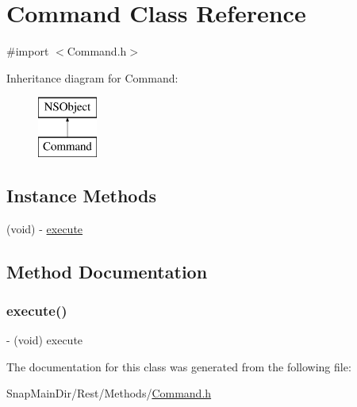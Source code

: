 \hypertarget{interface_command}{}\section{Command Class Reference}
\label{interface_command}


{\ttfamily \#import $<$Command.\+h$>$}

Inheritance diagram for Command\+:\begin{figure}[H]
\begin{center}
\leavevmode
\includegraphics[height=2.000000cm]{interface_command}
\end{center}
\end{figure}
\subsection*{Instance Methods}
\begin{DoxyCompactItemize}
\item 
(void) -\/ \hyperlink{interface_command_abc8574913684044b0f1a9f810b4e969b}{execute}
\end{DoxyCompactItemize}


\subsection{Method Documentation}
\hypertarget{interface_command_abc8574913684044b0f1a9f810b4e969b}{}\label{interface_command_abc8574913684044b0f1a9f810b4e969b} 
\subsubsection{\texorpdfstring{execute()}{execute()}}
{\footnotesize\ttfamily -\/ (void) execute \begin{DoxyParamCaption}{ }\end{DoxyParamCaption}}



The documentation for this class was generated from the following file\+:\begin{DoxyCompactItemize}
\item 
Snap\+Main\+Dir/\+Rest/\+Methods/\hyperlink{_command_8h}{Command.\+h}\end{DoxyCompactItemize}
